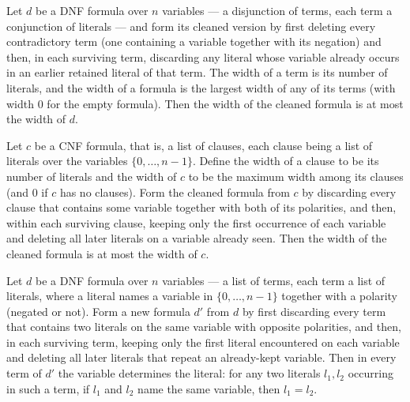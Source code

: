 \begin{lemma}
\label{LMN.cleanDNF_width_le}
\leanok
{}
Let $d$ be a DNF formula over $n$ variables — a disjunction of terms, each term a
conjunction of literals — and form its cleaned version by first deleting every
contradictory term (one containing a variable together with its negation) and then, in
each surviving term, discarding any literal whose variable already occurs in an earlier
retained literal of that term. The width of a term is its number of literals, and the
width of a formula is the largest width of any of its terms (with width $0$ for the
empty formula). Then the width of the cleaned formula is at most the width of $d$.
\end{lemma}

\begin{lemma}
\label{LMN.cleanCNF_width_le}
\leanok
{}
Let $c$ be a CNF formula, that is, a list of clauses, each clause being a list of
literals over the variables $\{0,\dots,n-1\}$. Define the width of a clause to be its
number of literals and the width of $c$ to be the maximum width among its clauses (and
$0$ if $c$ has no clauses). Form the cleaned formula from $c$ by discarding every clause
that contains some variable together with both of its polarities, and then, within each
surviving clause, keeping only the first occurrence of each variable and deleting all
later literals on a variable already seen. Then the width of the cleaned formula is at
most the width of $c$.
\end{lemma}

\begin{lemma}
\label{LMN.cleanDNF_var_inj}
\leanok
{}
Let $d$ be a DNF formula over $n$ variables — a list of terms, each term a list of
literals, where a literal names a variable in $\{0,\dots,n-1\}$ together with a polarity
(negated or not). Form a new formula $d'$ from $d$ by first discarding every term that
contains two literals on the same variable with opposite polarities, and then, in each
surviving term, keeping only the first literal encountered on each variable and deleting
all later literals that repeat an already-kept variable. Then in every term of $d'$ the
variable determines the literal: for any two literals $l_1, l_2$ occurring in such a
term, if $l_1$ and $l_2$ name the same variable, then $l_1 = l_2$.
\end{lemma}

